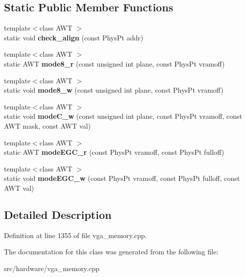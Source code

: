 \subsection*{Static Public Member Functions}
\begin{DoxyCompactItemize}
\item 
\hypertarget{classVGA__PC98__PageHandler_ad0cab17b7f08ec55aea9fa00c6154ef5}{{\footnotesize template$<$class A\-W\-T $>$ }\\static void {\bfseries check\-\_\-align} (const Phys\-Pt addr)}\label{classVGA__PC98__PageHandler_ad0cab17b7f08ec55aea9fa00c6154ef5}

\item 
\hypertarget{classVGA__PC98__PageHandler_a258b7ab8e0bf52a16e15c16ab0811670}{{\footnotesize template$<$class A\-W\-T $>$ }\\static A\-W\-T {\bfseries mode8\-\_\-r} (const unsigned int plane, const Phys\-Pt vramoff)}\label{classVGA__PC98__PageHandler_a258b7ab8e0bf52a16e15c16ab0811670}

\item 
\hypertarget{classVGA__PC98__PageHandler_a64b218e643644a33e0c298622dbe72b9}{{\footnotesize template$<$class A\-W\-T $>$ }\\static void {\bfseries mode8\-\_\-w} (const unsigned int plane, const Phys\-Pt vramoff)}\label{classVGA__PC98__PageHandler_a64b218e643644a33e0c298622dbe72b9}

\item 
\hypertarget{classVGA__PC98__PageHandler_ad50a2f65155811c9398c8c17ccf65fb1}{{\footnotesize template$<$class A\-W\-T $>$ }\\static void {\bfseries mode\-C\-\_\-w} (const unsigned int plane, const Phys\-Pt vramoff, const A\-W\-T mask, const A\-W\-T val)}\label{classVGA__PC98__PageHandler_ad50a2f65155811c9398c8c17ccf65fb1}

\item 
\hypertarget{classVGA__PC98__PageHandler_a12e4eba4a8b70a108fa7623c3333043e}{{\footnotesize template$<$class A\-W\-T $>$ }\\static A\-W\-T {\bfseries mode\-E\-G\-C\-\_\-r} (const Phys\-Pt vramoff, const Phys\-Pt fulloff)}\label{classVGA__PC98__PageHandler_a12e4eba4a8b70a108fa7623c3333043e}

\item 
\hypertarget{classVGA__PC98__PageHandler_aea2664bee908ecf657cb3d114303d867}{{\footnotesize template$<$class A\-W\-T $>$ }\\static void {\bfseries mode\-E\-G\-C\-\_\-w} (const Phys\-Pt vramoff, const Phys\-Pt fulloff, const A\-W\-T val)}\label{classVGA__PC98__PageHandler_aea2664bee908ecf657cb3d114303d867}

\end{DoxyCompactItemize}


\subsection{Detailed Description}


Definition at line 1355 of file vga\-\_\-memory.\-cpp.



The documentation for this class was generated from the following file\-:\begin{DoxyCompactItemize}
\item 
src/hardware/vga\-\_\-memory.\-cpp\end{DoxyCompactItemize}
